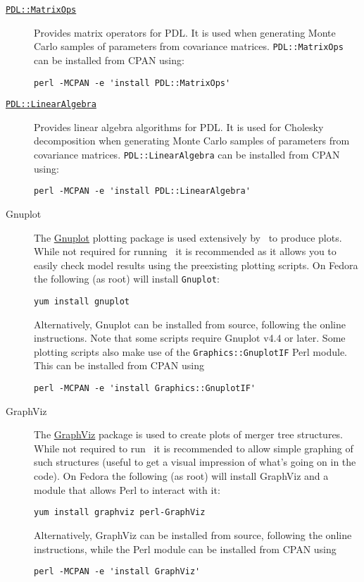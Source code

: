 \begin{description}
  \item [\href{http://search.cpan.org/~chm/PDL-2.4.7/Basic/MatrixOps/matrixops.pd}{{\tt PDL::MatrixOps}}] Provides matrix operators for PDL. It is used when generating Monte Carlo samples of parameters from covariance matrices. {\tt PDL::MatrixOps} can be installed from CPAN using:
\begin{verbatim}
perl -MCPAN -e 'install PDL::MatrixOps'
\end{verbatim}
  \item [\href{http://search.cpan.org/~ellipse/PDL-LinearAlgebra-0.06/LinearAlgebra.pm}{{\tt PDL::LinearAlgebra}}] Provides linear algebra algorithms for PDL. It is used for Cholesky decomposition when generating Monte Carlo samples of parameters from covariance matrices. {\tt PDL::LinearAlgebra} can be installed from CPAN using:
\begin{verbatim}
perl -MCPAN -e 'install PDL::LinearAlgebra'
\end{verbatim}

\item[Gnuplot] The \href{http://www.gnuplot.info/}{\sc Gnuplot} plotting package is used extensively by \glc\ to produce plots. While not required for running \glc\ it is recommended as it allows you to easily check model results using the preexisting plotting scripts. On Fedora the following (as root) will install {\tt Gnuplot}:
\begin{verbatim}
yum install gnuplot
\end{verbatim}
Alternatively, {\sc Gnuplot} can be installed from source, following the online instructions. Note that some scripts require {\sc Gnuplot} v4.4 or later. Some plotting scripts also make use of the {\tt Graphics::GnuplotIF} Perl module. This can be installed from CPAN using
\begin{verbatim}
perl -MCPAN -e 'install Graphics::GnuplotIF'
\end{verbatim}

\item[GraphViz] The \href{http://www.graphviz.org/}{GraphViz} package is used to create plots of merger tree structures. While not required to run \glc\ it is recommended to allow simple graphing of such structures (useful to get a visual impression of what's going on in the code). On Fedora the following (as root) will install GraphViz and a module that allows Perl to interact with it:
\begin{verbatim}
yum install graphviz perl-GraphViz
\end{verbatim}
Alternatively, GraphViz can be installed from source, following the online instructions, while the Perl module can be installed from CPAN using
\begin{verbatim}
perl -MCPAN -e 'install GraphViz'
\end{verbatim}

\end{description}

